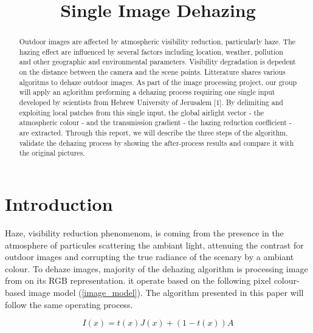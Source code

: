 \documentclass[conference]{IEEEtran}
\begin{document}
\title{Single Image Dehazing}

\author{
\and
{}
\and
{}
}

\maketitle

\begin{abstract}
Outdoor images are affected by atmospheric visibility reduction, particularly haze. The hazing effect are influenced by several 
factors including location, weather, pollution and other geographic and environmental parameters. Visibility degradation is 
depedent on the distance between the camera and the scene points. Litterature shares various algoritms to dehaze outdoor 
images.  As part of the image processing project, our group will apply an aglorithm preforming a dehazing process requiring
one single input developed by scientists from Hebrew University of Jerusalem [1]. By delimiting and exploiting local patches from this single input, the global airlight vector - the atmospheric
 colour - and the transmission gradient - the hazing reduction coefficient - are extracted.  Through this report, we will describe 
 the three steps of the algorithm, validate the dehazing process by showing the after-process results and compare it with the 
 original pictures.  
\end{abstract}

\section{Introduction}

Haze, visibility reduction phenomenom, is coming from the presence in the atmosphere of particules scattering the ambiant 
light, attenuing the contrast for outdoor images and corrupting the true radiance of the scenary by a ambiant colour.
To dehaze images, majority of the dehazing algorithm is processing image from on its RGB representation.
 it operate based on the following pixel colour-based image model (\ref{image_model}).  The algorithm presented in this paper will follow the same 
operating process.

\begin{equation}
\label{image_model}
I(x) = t(x) J(x) + (1-t(x)) A
\end{equation}
\end{document}
